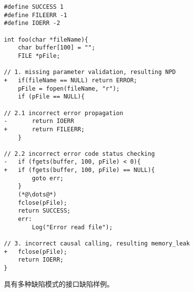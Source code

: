 \begin{figure}[b]
	\centering
	\begin{minipage}[t]{0.8\linewidth}
\begin{lstlisting}
#define SUCCESS 1
#define FILEERR -1
#define IOERR -2		

int foo(char *fileName){
	char buffer[100] = "";
	FILE *pFile;

// 1. missing parameter validation, resulting NPD
+   if(fileName == NULL) return ERROR;
	pFile = fopen(fileName, "r");
	if (pFile == NULL){

// 2.1 incorrect error propagation
-       return IOERR
+       return FILEERR;
	}

// 2.2 incorrect error code status checking
-   if (fgets(buffer, 100, pFile) < 0){
+   if (fgets(buffer, 100, pFile) == NULL){
		goto err;
	}
	(*@\dots@*)
	fclose(pFile);
	return SUCCESS; 
	err:
		Log("Error read file");

// 3. incorrect causal calling, resulting memory_leak
+   fclose(pFile);
	return IOERR;
}
\end{lstlisting}
	\caption{
	具有多种缺陷模式的接口缺陷样例。
	}
	\label{fig:2-4-example}
	\end{minipage}
\end{figure}